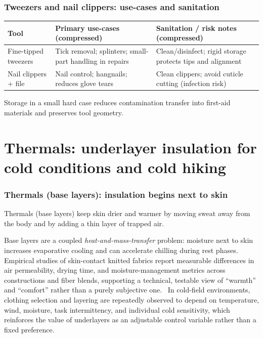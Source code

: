 \begin{frame}[t,shrink=18]
  \frametitle{Tweezers and nail clippers: use-cases and sanitation}
  \justifying
  \scriptsize
  \renewcommand{\arraystretch}{0.95}
  \setlength{\tabcolsep}{4pt}
  \begin{table}
    \centering
    \begin{tabularx}{\textwidth}{@{}lX X@{}}
      \toprule
      Tool & Primary use-cases (compressed) & Sanitation / risk notes (compressed) \\
      \midrule
      Fine-tipped tweezers & Tick removal; splinters; small-part handling in repairs & Clean/disinfect; rigid storage protects tips and alignment \\
      \addlinespace
      Nail clippers + file & Nail control; hangnails; reduces glove tears & Clean clippers; avoid cuticle cutting (infection risk) \\
      \bottomrule
    \end{tabularx}
  \end{table}

  \vspace{0.4em}
  \scriptsize
  Storage in a small hard case reduces contamination transfer into first-aid materials and preserves tool geometry.
\end{frame}


\section{Thermals: underlayer insulation for cold conditions and cold hiking}

\begin{frame}[t]
  \frametitle{Thermals (base layers): insulation begins next to skin}
  \justifying
  \begin{block}
    Thermals (base layers) keep skin drier and warmer by moving sweat away from the body and by adding a thin layer of trapped air.
  \end{block}

  \begin{block}
    Base layers are a coupled \emph{heat-and-mass-transfer} problem: moisture next to skin increases evaporative cooling and can accelerate chilling during rest phases. Empirical studies of skin-contact knitted fabrics report measurable differences in air permeability, drying time, and moisture-management metrics across constructions and fiber blends, supporting a technical, testable view of ``warmth'' and ``comfort'' rather than a purely subjective one.~\cite{vasile_knit_2025} 
    In cold-field environments, clothing selection and layering are repeatedly observed to depend on temperature, wind, moisture, task intermittency, and individual cold sensitivity, which reinforces the value of underlayers as an adjustable control variable rather than a fixed preference.~\cite{jussila_arctic_2017}
  \end{block}
\end{frame}

